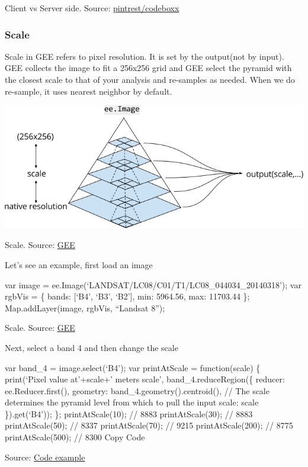\documentclass[
  letterpaper,
  DIV=11,
  numbers=noendperiod]{scrreprt}
\begin{document}
Client vs Server side. Source:
\href{https://www.pinterest.co.uk/pin/764837949191948083/}{pintrest/codeboxx}

\hypertarget{scale}{%
\subsubsection{Scale}\label{scale}}

Scale in GEE refers to pixel resolution. It is set by the output(not by
input). GEE collects the image to fit a 256x256 grid and GEE select the
pyramid with the closest scale to that of your analysis and re-samples
as needed. When we do re-sample, it uses nearest neighbor by default.

\includegraphics{./images/paste-80D175DE.png}

Scale. Source:
\href{https://developers.google.com/earth-engine/guides/scale}{GEE}

Let's see an example, first load an image

var image = ee.Image(`LANDSAT/LC08/C01/T1/LC08\_044034\_20140318'); var
rgbVis = \{ bands: {[}`B4', `B3', `B2'{]}, min: 5964.56, max: 11703.44
\}; Map.addLayer(image, rgbVis, ``Landsat 8'');

Scale. Source:
\href{https://developers.google.com/earth-engine/guides/scale}{GEE}

Next, select a band 4 and then change the scale

var band\_4 = image.select(`B4'); var printAtScale = function(scale) \{
print(`Pixel value at'+scale+' meters scale', band\_4.reduceRegion(\{
reducer: ee.Reducer.first(), geometry: band\_4.geometry().centroid(), //
The scale determines the pyramid level from which to pull the input
scale: scale \}).get(`B4')); \}; printAtScale(10); // 8883
printAtScale(30); // 8883 printAtScale(50); // 8337 printAtScale(70); //
9215 printAtScale(200); // 8775 printAtScale(500); // 8300 Copy Code

Source:
\href{https://code.earthengine.google.com/82d6c28210a115f2446c0ca8e7a65e51}{Code
example}
\end{document}

